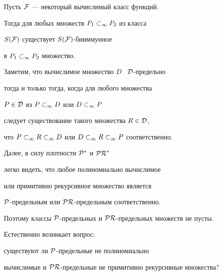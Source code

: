 \begin{cor}


Пусть $\cal{F}$ --- некоторый вычислимый класс функций.


Тогда для любых множеств ${P_1}\subset_\infty{P_2}$ из класса


$S(\cal{F})$ существует $S(\cal{F})$-бииммунное


в ${P_1}\subset_\infty{P_2}$ множество.


\end{cor}





Заметим, что вычислимое множество $D$ \ $\cal{D}$-предельно


тогда и только тогда, когда для любого множества


$P\in\cal{D}$ из ${P}\subset_\infty{D}$ или ${D}\subset_\infty{P}$


следует существование такого множества $R\in\cal{D}$,


что ${P}\subset_\infty{{R}\subset_\infty{D}}$ или ${D}\subset_\infty{{R}\subset_\infty{P}}$ соответственно.





Далее, в силу плотности $\cal{P}^*$ и $\cal{PR}^*$


легко видеть, что любое полиномиально вычислимое


или примитивно рекурсивное множество является


$\cal{P}$-предельным или $\cal{PR}$-предельным соответственно.


Поэтому классы $\cal{P}$-предельных и $\cal{PR}$-предельных множеств не пусты.


Естественно возникает вопрос:


существуют ли $\cal{P}$-предельные не полиномиально


вычислимые и $\cal{PR}$-предельные не примитивно рекурсивные множества?









